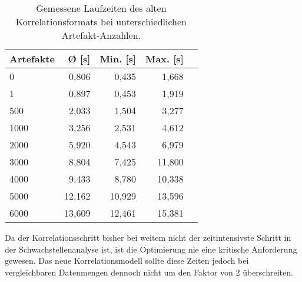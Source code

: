 \begin{table}[h!]
    \centering
    \begin{tabular}{l r r r r}
        \toprule
        \textbf{Artefakte} & \textbf{Ø [s]} & \textbf{Min. [s]} & \textbf{Max. [s]} \\
        \midrule
        0                  & 0,806          & 0,435             & 1,668             \\
        1                  & 0,897          & 0,453             & 1,919             \\
        500                & 2,033          & 1,504             & 3,277             \\
        1000               & 3,256          & 2,531             & 4,612             \\
        2000               & 5,920          & 4,543             & 6,979             \\
        3000               & 8,804          & 7,425             & 11,800            \\
        4000               & 9,433          & 8,780             & 10,338            \\
        5000               & 12,162         & 10,929            & 13,596            \\
        6000               & 13,609         & 12,461            & 15,381            \\
        \bottomrule
    \end{tabular}
    \caption{Gemessene Laufzeiten des alten Korrelationsformats bei unterschiedlichen Artefakt-Anzahlen.}
    \label{tab:old-correlation-performance}
\end{table}

Da der Korrelationsschritt bisher bei weitem nicht der zeitintensivste Schritt in der Schwachstellenanalyse ist, ist die Optimierung nie eine kritische Anforderung gewesen.
Das neue Korrelationsmodell sollte diese Zeiten jedoch bei vergleichbaren Datenmengen dennoch nicht um den Faktor von 2 überschreiten.

